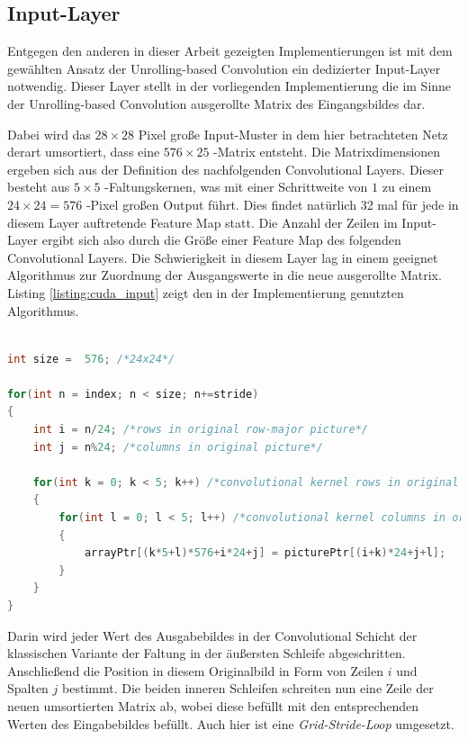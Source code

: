 \documentclass[../main.tex]{subfiles}
\begin{document}
\subsection{Input-Layer} \label{sec:cuda_input}
Entgegen den anderen in dieser Arbeit gezeigten Implementierungen ist mit dem gewählten Ansatz der Unrolling-based Convolution ein dedizierter Input-Layer notwendig. Dieser Layer stellt in der vorliegenden Implementierung die im Sinne der  Unrolling-based Convolution ausgerollte Matrix des Eingangsbildes dar. \par 
Dabei wird das $28\times 28$ Pixel große Input-Muster in dem hier betrachteten Netz derart umsortiert, dass eine $576\times 25$ -Matrix entsteht. Die Matrixdimensionen ergeben sich aus der Definition des nachfolgenden Convolutional Layers. Dieser besteht aus $5\times 5$ -Faltungskernen, was mit einer Schrittweite von $1$ zu einem $24\times24 = 576$ -Pixel großen Output führt. Dies findet natürlich 32 mal für jede in diesem Layer auftretende Feature Map statt. Die Anzahl der Zeilen im Input-Layer ergibt sich also durch die Größe einer Feature Map des folgenden Convolutional Layers. Die Schwierigkeit in diesem Layer lag in einem geeignet Algorithmus zur Zuordnung der Ausgangswerte in die neue ausgerollte Matrix. Listing \ref{listing:cuda_input} zeigt den in der Implementierung genutzten Algorithmus. \par \clearpage 
\begin{lstlisting}[language=C, caption=Umsortierung im Input-Layer , captionpos=b, label=listing:cuda_input, breaklines]

int size =  576; /*24x24*/

for(int n = index; n < size; n+=stride)
{
	int i = n/24; /*rows in original row-major picture*/
	int j = n%24; /*columns in original picture*/
	
	for(int k = 0; k < 5; k++) /*convolutional kernel rows in original picture*/
	{
		for(int l = 0; l < 5; l++) /*convolutional kernel columns in original picture*/
		{
			arrayPtr[(k*5+l)*576+i*24+j] = picturePtr[(i+k)*24+j+l];
		}
	}
}
\end{lstlisting}
Darin wird jeder Wert des Ausgabebildes in der Convolutional Schicht der klassischen Variante der Faltung in der äußersten Schleife abgeschritten. Anschließend die Position in diesem Originalbild in Form von Zeilen $i$ und Spalten $j$ bestimmt. Die beiden inneren Schleifen schreiten nun eine Zeile der neuen umsortierten Matrix ab, wobei diese befüllt mit den entsprechenden Werten des Eingabebildes befüllt. Auch hier ist eine \emph{Grid-Stride-Loop} umgesetzt. \par 
\end{document}
